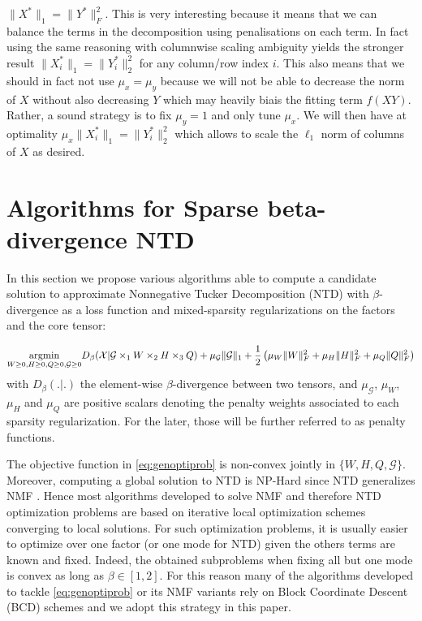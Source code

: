 \documentclass[a4paper, 11pt]{article}
\begin{document}
\begin{itemize}
  \( \|X^\ast\|_1 = \|Y^\ast\|_F^2 \). This is very interesting because it means that we can balance the terms in the decomposition using penalisations on each term. In fact using the same reasoning with columnwise scaling ambiguity yields the stronger result \( \|X^\ast_i\|_1 = \|Y^\ast_i\|_2^2 \) for any column/row index \( i \). This also means that we should in fact not use \( \mu_x = \mu_y \) because we will not be able to decrease the norm of \( X \) without also decreasing \( Y \) which may heavily biais the fitting term \( f(XY) \). Rather, a sound strategy is to fix \(\mu_y = 1 \) and only tune \( \mu_x \). We will then have at optimality \( \mu_x\|X^\ast_i\|_1 = \|Y^\ast_i\|_2^2  \) which allows to scale the \( \ell_1 \) norm of columns of \( X \) as desired.
\end{itemize}

\section{Algorithms for Sparse beta-divergence NTD}
In this section we propose various algorithms able to compute a candidate solution to approximate Nonnegative Tucker Decomposition (NTD) with $\beta$-divergence as a loss function and mixed-sparsity regularizations on the factors and the core tensor:

\begin{equation}\label{eq:genoptiprob}
  \underset{W \geq 0,H \geq 0,Q \geq 0,\mathcal{G} \geq 0}{\mathop{\text{~argmin~}}}D_{\beta}(\mathcal{X}|\mathcal{G} \times_1 W \times_2 H \times_3 Q) + \mu_{\mathcal{G}} \|\mathcal{G}\|_1 + \frac{1}{2} \left( \mu_W \|W\|_F^2 + \mu_H \|H\|_F^2 + \mu_Q \|Q\|_F^2 \right)
\end{equation}
with $D_{\beta}(.|.)$ the element-wise $\beta$-divergence between two tensors, and $\mu_{\mathcal{G}}$, $\mu_W$, $\mu_H$ and $\mu_Q$ are positive scalars denoting the penalty weights associated to each sparsity regularization. For the later, those will be further referred to as penalty functions.

The objective function in \eqref{eq:genoptiprob} is non-convex jointly in $\{W,H,Q,\mathcal{G}\}$. Moreover, computing a global solution to NTD is NP-Hard since NTD generalizes NMF \cite{Vavasis2010complexity,marmoret2021nonnegative}. Hence most algorithms developed to solve NMF and therefore NTD optimization problems are based on iterative local optimization schemes converging to local solutions. For such optimization problems, it is usually easier to optimize over one factor (or one mode for NTD) given the others terms are known and fixed. Indeed, the obtained subproblems when fixing all but one mode is convex as long as $\beta \in \left[1,2\right]$. For this reason many of the algorithms developed to tackle \eqref{eq:genoptiprob} or its NMF variants rely on Block Coordinate Descent (BCD) schemes and we adopt this strategy in this paper. 
\end{document}
